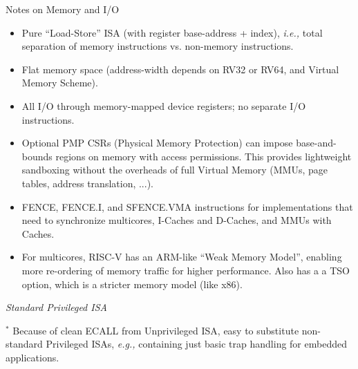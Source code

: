 \documentclass{article}
\newcommand{\ie}{\emph{i.e.,}}
\newcommand{\eg}{\emph{e.g.,}}
\begin{document}
\begin{center}
  {\Huge
    Notes on Memory and I/O}

  \vspace*{0.5in}

  \begin{minipage}{9in}\LARGE
    \begin{itemize}

    \item Pure ``Load-Store'' ISA (with register base-address +
      index), {\ie} total separation of memory instructions
      vs. non-memory instructions.

    \item Flat memory space (address-width depends on RV32 or RV64, and Virtual Memory Scheme).

    \item All I/O through memory-mapped device registers; no separate I/O instructions.

    \item Optional PMP CSRs (Physical Memory Protection) can impose
      base-and-bounds regions on memory with access permissions.  This
      provides lightweight sandboxing without the overheads of full
      Virtual Memory (MMUs, page tables, address translation, ...).

    \item FENCE, FENCE.I, and SFENCE.VMA instructions for
      implementations that need to synchronize multicores, I-Caches
      and D-Caches, and MMUs with Caches.

    \item For multicores, RISC-V has an ARM-like ``Weak Memory
      Model'', enabling more re-ordering of memory traffic for higher
      performance.  Also has a a TSO option, which is a stricter
      memory model (like x86).

    \end{itemize}
  \end{minipage}
\end{center}

\clearpage


\vspace*{3in}

\begin{center}\Huge
  \emph{Standard Privileged ISA}

\vfill

\begin{minipage}{9in}\Large
  $^*$ Because of clean ECALL from Unprivileged ISA, easy to
  substitute non-standard Privileged ISAs, {\eg} containing just basic
  trap handling for embedded applications.
\end{minipage}

\end{center}
\end{document}
